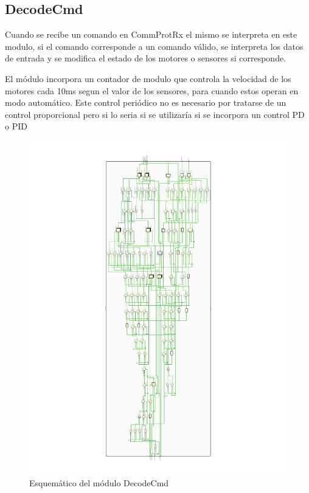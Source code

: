 \documentclass[12pt]{article}
\begin{document}
\subsection{DecodeCmd}
Cuando se recibe un comando en CommProtRx el mismo se interpreta en este modulo, si el comando corresponde a un comando válido, se interpreta los datos de entrada y se modifica el estado de los motores o sensores si corresponde.

El módulo incorpora un contador de modulo que controla la velocidad de los motores cada 10ms segun el valor de los sensores, para cuando estos operan en modo automático. Este control periódico no es necesario por tratarse de un control proporcional pero si lo seria si se utilizaría si se incorpora un control PD o PID

\begin{figure}[H]
    \centering
    \includegraphics[width=\textwidth]{decode-cmd}
    \caption{Esquemático del módulo DecodeCmd}
\end{figure}
\end{document}
